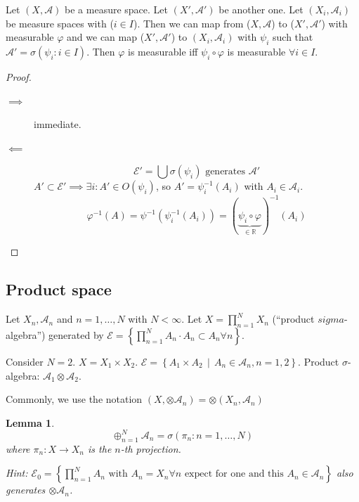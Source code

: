 \documentclass[a4paper]{article}
\newcounter{lecref}[section]
\numberwithin{lecref}{section}
\theoremstyle{break}
\newtheorem{lemma}[lecref]{Lemma}
\newcommand{\Set}[1]{\left\{#1\right\}}
\newcommand{\SetDef}[2]{\left\{#1\,\mid\,#2\right\}}
\begin{document}
\begin{theorem}
  \label{thm-maps}
  Let $(X, \mathcal A)$ be a measure space. Let $(X', \mathcal A')$ be another one.
  Let $(X_i, \mathcal A_i)$ be measure spaces with ($i \in I$). %
  Then we can map from ($X, \mathcal A$) to ($X', \mathcal A'$) with measurable $\varphi$ and we can map ($X', \mathcal A'$) to $(X_i, \mathcal A_i)$ with $\psi_i$ such that $\mathcal A' = \sigma(\psi_i: i \in I)$. Then $\varphi$ is measurable iff $\psi_i \circ \varphi$ is measurable $\forall i \in I$.
\end{theorem}

\begin{proof}
  \begin{description}
    \item[$\implies$]
      immediate.
    \item[$\impliedby$]
      \[ \mathcal E' = \bigcup \sigma(\psi_i) \text{ generates $\mathcal A'$} \]
      $A' \subset \mathcal E' \implies \exists i: A' \in O(\psi_i)$, so $A' = \psi_i^{-1}(A_i)$ with $A_i \in \mathcal A_i$.
      \[ \varphi^{-1}(A) = \psi^{-1}(\psi_i^{-1}(A_i)) = (\underbrace{\psi_i \circ \varphi}_{\in \mathbb R})^{-1} (A_i)  \]
  \end{description}
\end{proof}

\subsection{Product space}

Let $X_n, \mathcal A_n$ and $n = 1, \dots, N$ with $N < \infty$.
Let $X = \prod_{n=1}^N X_n$ (\enquote{product $sigma$-algebra})
generated by $\mathcal E = \Set{\prod_{n=1}^N A_n \cdot A_n \subset A_n \forall n}$.

Consider $N = 2$. $X = X_1 \times X_2$. $\mathcal E = \SetDef{A_1 \times A_2}{A_n \in \mathcal A_n, n = 1, 2}$.
Product $\sigma$-algebra: $\mathcal A_1 \otimes \mathcal A_2$.

Commonly, we use the notation $(X, \otimes \mathcal A_n) = \otimes(X_n, \mathcal A_n)$

\begin{lemma}
  \[ \oplus_{n=1}^N \mathcal A_n = \sigma\left(\pi_n: n = 1, \dots, N\right) \]
  where $\pi_n: X \to X_n$ is the $n$-th projection.

  Hint: $\mathcal E_0 = \Set{\prod_{n=1}^N A_n \text{ with } A_n = X_n \forall n \text{ expect for one and this } A_n \in \mathcal A_n}$ also generates $\otimes \mathcal A_n$.
\end{lemma}
\end{document}
